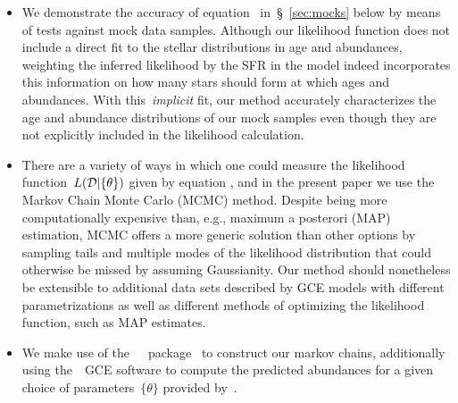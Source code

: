 \documentclass[ms.tex]{subfiles}
\begin{document}
\begin{itemize}
	\item 
	We demonstrate the accuracy of equation~
	in~\S~\ref{sec:mocks} below by means of tests against mock data samples.
	Although our likelihood function does not include a direct fit to
	the stellar distributions in age and abundances, weighting the inferred
	likelihood by the SFR in the model indeed incorporates this information on
	how many stars should form at which ages and abundances.
	With this~\textit{implicit} fit, our method accurately characterizes the
	age and abundance distributions of our mock samples even though they are
	not explicitly included in the likelihood calculation.

	\item There are a variety of ways in which one could measure the likelihood
	function~$L(\mathcal{D} | \{\theta\})$ given by equation
	, and in the present paper we use the Markov Chain
	Monte Carlo (MCMC) method.
	Despite being more computationally expensive than, e.g., maximum a posterori
	(MAP) estimation, MCMC offers a more generic solution than other options by
	sampling tails and multiple modes of the likelihood distribution that could
	otherwise be missed by assuming Gaussianity.
	Our method should nonetheless be extensible to additional data sets
	described by GCE models with different parametrizations as well as
	different methods of optimizing the likelihood function, such as MAP
	estimates.

	\item We make use of the~\mc~\python~package~\citep{Foreman-Mackey2013} to
	construct our markov chains, additionally using the~\vice~GCE software
	\citep{Johnson2020} to compute the predicted abundances for a given choice
	of parameters~$\{\theta\}$ provided by~\mc.

\end{itemize}
\end{document}
